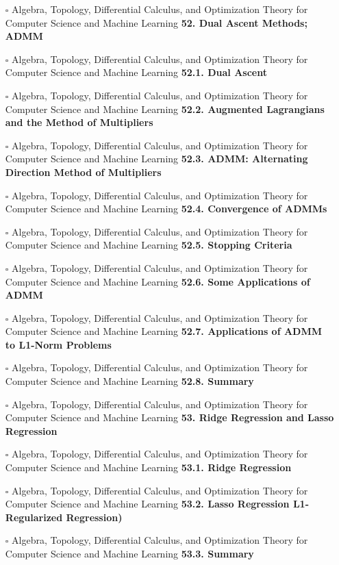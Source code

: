 \documentclass[a4, landscape, 12pt]{article}
\newcommand{\checkbox}{$\square$}%
\begin{document}
\begin{itemize}
{}
\item [\checkbox]  Algebra, Topology, Differential Calculus, and Optimization Theory for Computer Science and Machine Learning \textbf{ 52. Dual Ascent Methods; ADMM
}
\item [\checkbox]  Algebra, Topology, Differential Calculus, and Optimization Theory for Computer Science and Machine Learning \textbf{ 52.1. Dual Ascent
}
\item [\checkbox]  Algebra, Topology, Differential Calculus, and Optimization Theory for Computer Science and Machine Learning \textbf{ 52.2. Augmented Lagrangians and the Method of Multipliers
}
\item [\checkbox]  Algebra, Topology, Differential Calculus, and Optimization Theory for Computer Science and Machine Learning \textbf{ 52.3. ADMM: Alternating Direction Method of Multipliers
}
\item [\checkbox]  Algebra, Topology, Differential Calculus, and Optimization Theory for Computer Science and Machine Learning \textbf{ 52.4. Convergence of ADMMs
}
\item [\checkbox]  Algebra, Topology, Differential Calculus, and Optimization Theory for Computer Science and Machine Learning \textbf{ 52.5. Stopping Criteria
}
\item [\checkbox]  Algebra, Topology, Differential Calculus, and Optimization Theory for Computer Science and Machine Learning \textbf{ 52.6. Some Applications of ADMM
}
\item [\checkbox]  Algebra, Topology, Differential Calculus, and Optimization Theory for Computer Science and Machine Learning \textbf{ 52.7. Applications of ADMM to L1-Norm Problems
}
\item [\checkbox]  Algebra, Topology, Differential Calculus, and Optimization Theory for Computer Science and Machine Learning \textbf{ 52.8. Summary
}
\item [\checkbox]  Algebra, Topology, Differential Calculus, and Optimization Theory for Computer Science and Machine Learning \textbf{ 53. Ridge Regression and Lasso Regression
}
\item [\checkbox]  Algebra, Topology, Differential Calculus, and Optimization Theory for Computer Science and Machine Learning \textbf{ 53.1. Ridge Regression
}
\item [\checkbox]  Algebra, Topology, Differential Calculus, and Optimization Theory for Computer Science and Machine Learning \textbf{ 53.2. Lasso Regression L1-Regularized Regression)
}
\item [\checkbox]  Algebra, Topology, Differential Calculus, and Optimization Theory for Computer Science and Machine Learning \textbf{ 53.3. Summary
}
\end{itemize}
\end{document}
